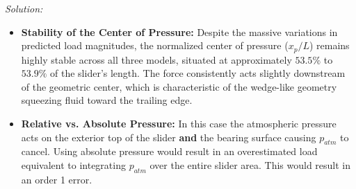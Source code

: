 \documentclass[11pt]{article}
\newenvironment{solution}
    {\textit{Solution:}}
    {}
\begin{document}
\begin{solution}
\begin{itemize}
    \item \textbf{Stability of the Center of Pressure:} 
    Despite the massive variations in predicted load magnitudes, the normalized center of pressure ($x_p/L$) remains highly stable across all three models, situated at approximately $53.5\%$ to $53.9\%$ of the slider's length. The force consistently acts slightly downstream of the geometric center, which is characteristic of the wedge-like geometry squeezing fluid toward the trailing edge. 

    \item \textbf{Relative vs. Absolute Pressure:}
    In this case the atmospheric pressure acts on the exterior top of the slider \textbf{and} the bearing surface causing $p_{atm}$ to cancel.
    Using absolute pressure would result in an overestimated load equivalent to integrating $p_{atm}$ over the entire slider area.
    This would result in an order 1 error. 

\end{itemize}
\end{solution}
\end{document}
